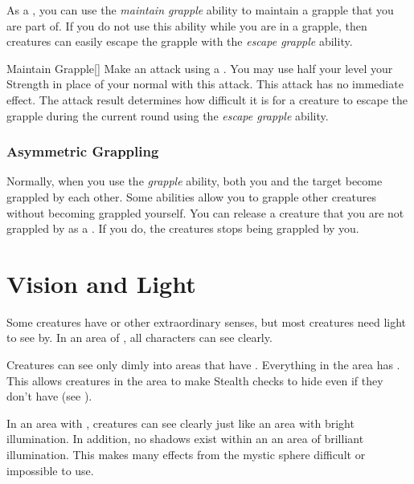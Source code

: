             \label{Maintain Grapple} As a , you can use the \textit{maintain grapple} ability to maintain a grapple that you are part of.
            If you do not use this ability while you are in a grapple, then creatures can easily escape the grapple with the \textit{escape grapple} ability.
            \begin{activeability}{Maintain Grapple}[]
                \rankline
                Make an attack using a .
                You may use half your level \add your Strength in place of your normal  with this attack.
                This attack has no immediate effect.
                The attack result determines how difficult it is for a creature to escape the grapple during the current round using the \textit{escape grapple} ability.
            \end{activeability}

        \subsubsection{Asymmetric Grappling}\label{Asymmetric Grappling}
            Normally, when you use the \textit{grapple} ability, both you and the target become grappled by each other.
            Some abilities allow you to grapple other creatures without becoming grappled yourself.
            You can release a creature that you are not grappled by as a .
            If you do, the creatures stops being grappled by you.

\section{Vision and Light}\label{Vision and Light}
    Some creatures have  or other extraordinary senses, but most creatures need light to see by. 
    In an area of , all characters can see clearly.

    Creatures can see only dimly into areas that have .
    Everything in the area has .
    This allows creatures in the area to make Stealth checks to hide even if they don't have  (see ).

    In an area with , creatures can see clearly just like an area with bright illumination.
    In addition, no shadows exist within an an area of brilliant illumination.
    This makes many effects from the  mystic sphere difficult or impossible to use.


